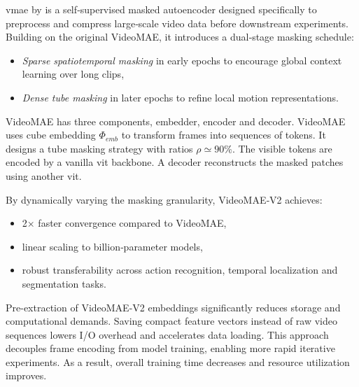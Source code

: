 \acrfull{vmae} by \textcite{wang_videomae_2023} is a self‑supervised masked autoencoder designed specifically to preprocess and compress large‑scale video data before downstream experiments. Building on the original VideoMAE, it introduces a dual‑stage masking schedule: 

\begin{itemize}
    \item \emph{Sparse spatiotemporal masking} in early epochs to encourage global context learning over long clips,
    \item \emph{Dense tube masking} in later epochs to refine local motion representations.
\end{itemize}

VideoMAE has three components, embedder, encoder and decoder. VideoMAE uses cube embedding \(\Phi_{emb}\) to transform frames into sequences of tokens. It designs a tube masking strategy with ratios \(\rho \simeq 90\%\). The visible tokens are encoded by a vanilla \acrshort{vit} backbone. A decoder reconstructs the masked patches using another \acrshort{vit}\cite{wang_videomae_2023}. 

By dynamically varying the masking granularity, VideoMAE‑V2 achieves:
\begin{itemize}
    \item 2× faster convergence compared to VideoMAE,
    \item linear scaling to billion‑parameter models,
    \item robust transferability across action recognition, temporal localization and segmentation tasks\cite{wang_videomae_2023}.
\end{itemize}

Pre-extraction of VideoMAE-V2 embeddings significantly reduces storage and computational demands. Saving compact feature vectors instead of raw video sequences lowers I/O overhead and accelerates data loading. This approach decouples frame encoding from model training, enabling more rapid iterative experiments. As a result, overall training time decreases and resource utilization improves. 

